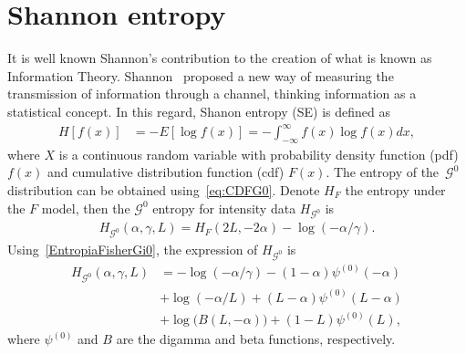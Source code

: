 \documentclass[journal]{IEEEtran}
\begin{document}
\section{Shannon entropy}

It is well known Shannon's contribution to the creation of what is known as Information Theory. 
Shannon~\cite{Shannon1948} proposed a new way of
measuring the transmission of information through a channel, thinking information as a statistical concept. 
In this regard, Shanon entropy (SE) is defined as
\begin{align}
	\label{SE}
	H[f(x)]&=-E[\log f(x)]=-\int_{-\infty}^{\infty} f(x) \log f(x) d x,
\end{align}
where $X$ is a continuous random variable with probability density function (pdf) $f(x)$ and
cumulative distribution function (cdf) $F(x)$. 
The entropy of the~$\mathcal{G}^0$ distribution can be obtained using~\eqref{eq:CDFG0}.
Denote $H_{F}$ the entropy under the $F$ model, then the $\mathcal{G}^0$ entropy for intensity data $H_{\mathcal G^0}$ is 
\begin{align}
	\label{EntropiaFisherGi0}
	H_{\mathcal G^0}(\alpha,\gamma,L)=H_{F}(2 L, - 2 \alpha) -\log(-\alpha / \gamma).
\end{align}
Using~\eqref{EntropiaFisherGi0}, the
expression of $H_{\mathcal G^0}$ is
\begin{align}
	\label{EG0}
	H_{\mathcal G^0}(\alpha,\gamma,L)&=-\log (-\alpha / \gamma)-(1-\alpha ) \psi^{(0)}(-\alpha )\\ \nonumber
	&+\log (-\alpha / L)+ ( L- \alpha ) \psi ^{(0)} ( L- \alpha )\\ \nonumber
	&+\log \big(B(L,-\alpha )\big)+(1-L) \psi^{(0)}(L),
\end{align}
where $\psi^{(0)}$ and $B$ are the digamma and beta functions, respectively.


\end{document}
